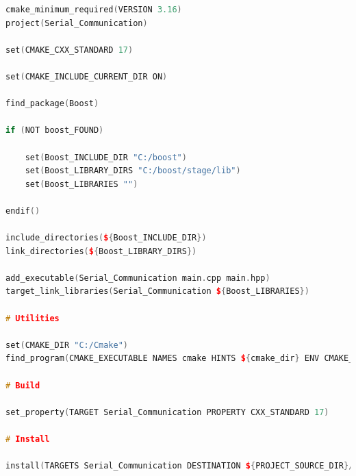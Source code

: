 \documentclass[transmag]{IEEEtran}
\begin{document}
\begin{lstlisting}[language=C++, caption=PC controller program - Serial Communication - CMake file]
cmake_minimum_required(VERSION 3.16)
project(Serial_Communication)

set(CMAKE_CXX_STANDARD 17)

set(CMAKE_INCLUDE_CURRENT_DIR ON)

find_package(Boost)

if (NOT boost_FOUND)

    set(Boost_INCLUDE_DIR "C:/boost")
    set(Boost_LIBRARY_DIRS "C:/boost/stage/lib")
    set(Boost_LIBRARIES "")

endif()

include_directories(${Boost_INCLUDE_DIR})
link_directories(${Boost_LIBRARY_DIRS})

add_executable(Serial_Communication main.cpp main.hpp)
target_link_libraries(Serial_Communication ${Boost_LIBRARIES})

# Utilities

set(CMAKE_DIR "C:/Cmake")
find_program(CMAKE_EXECUTABLE NAMES cmake HINTS ${cmake_dir} ENV CMAKE_DIR PATH_SUFFIXES bin)

# Build

set_property(TARGET Serial_Communication PROPERTY CXX_STANDARD 17)

# Install

install(TARGETS Serial_Communication DESTINATION ${PROJECT_SOURCE_DIR}/bin)
\end{lstlisting}

\clearpage
\newpage
\end{document}
